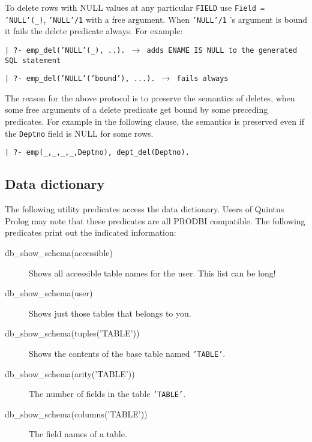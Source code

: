 To delete rows with NULL values at any particular {\tt FIELD} use {\tt Field = 'NULL'(\_)}, {\tt 'NULL'/1} with a free argument.  When {\tt 'NULL'/1} 's argument
is bound it fails the delete predicate always.  For example:

\begin{center}
{\tt | ?- emp\_del('NULL'(\_), ..).  $\rightarrow$ adds ENAME IS NULL to the generated SQL statement}
\end{center}
\begin{center}

{\tt | ?- emp\_del('NULL'('bound'), ...).  $\rightarrow$ fails always}

\end{center}

The reason for the above protocol is to preserve the semantics of deletes, 
when some free arguments of a delete predicate get bound by some preceding
predicates.  For example in the following clause, the semantics is preserved 
even if the {\tt Deptno} field is NULL for some rows.


\begin{center}

{\tt | ?- emp(\_,\_,\_,\_,Deptno), dept\_del(Deptno).}
\end{center}




\subsection{Data dictionary}


The following utility predicates access the data dictionary.  Users of
Quintus Prolog may note that these predicates are all PRODBI
compatible.  The following predicates print out the indicated information:
\begin{description}

\item[db\_show\_schema(accessible)]
	 Shows all accessible table names for the user.  This list can be long!

\item[db\_show\_schema(user)]
	Shows just those tables that belongs to you.

\item[db\_show\_schema(tuples('TABLE'))]
	Shows the contents of the base table named {\tt 'TABLE'}.

\item[db\_show\_schema(arity('TABLE'))]
	The number of fields in the table {\tt 'TABLE'}.

\item[db\_show\_schema(columns('TABLE'))]
	The field names of a table.
\end{description}


